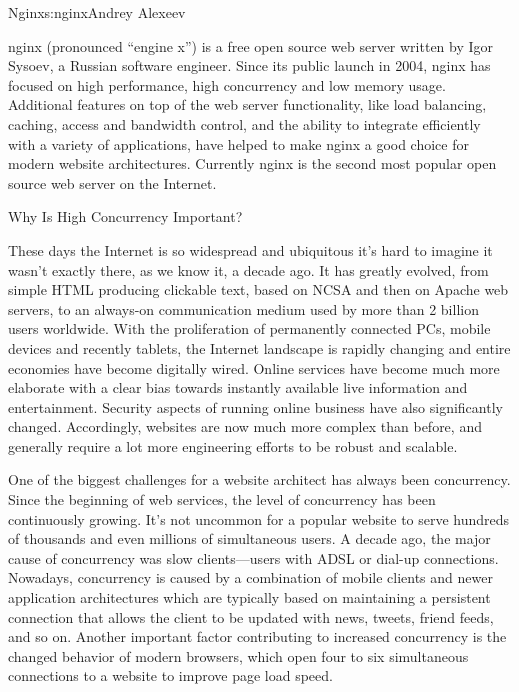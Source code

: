\begin{aosachapter}{Nginx}{s:nginx}{Andrey Alexeev}

nginx (pronounced ``engine x'') is a free open source web server
written by Igor Sysoev, a Russian software engineer. Since its public
launch in 2004, nginx has focused on high performance, high
concurrency and low memory usage. Additional features on top of the
web server functionality, like load balancing, caching, access and
bandwidth control, and the ability to integrate efficiently with a
variety of applications, have helped to make nginx a good choice for
modern website architectures. Currently nginx is the second most
popular open source web server on the Internet.

\begin{aosasect1}{Why Is High Concurrency Important?}


These days the Internet is so widespread and ubiquitous it's hard to
imagine it wasn't exactly there, as we know it, a decade ago. It has greatly evolved,
from simple HTML producing clickable text, based on NCSA and then on
Apache web servers, to an always-on communication medium used by more
than 2 billion users worldwide. With the proliferation of permanently
connected PCs, mobile devices and recently tablets, the Internet
landscape is rapidly changing and entire economies have become
digitally wired. Online services have become much more elaborate with
a clear bias towards instantly available live information and
entertainment. Security aspects of running online business have also
significantly changed. Accordingly, websites are now much more complex
than before, and generally require a lot more engineering efforts to
be robust and scalable.

One of the biggest challenges for a website architect has always been
concurrency. Since the beginning of web services, the level of
concurrency has been continuously growing. It's not uncommon for a
popular website to serve hundreds of thousands and even millions of
simultaneous users. A decade ago, the major cause of concurrency was
slow clients---users with ADSL or dial-up connections. Nowadays,
concurrency is caused by a combination of mobile clients and newer
application architectures which are typically based on maintaining a
persistent connection that allows the client to be updated with news,
tweets, friend feeds, and so on. Another important factor contributing
to increased concurrency is the changed behavior of modern browsers,
which open four to six simultaneous connections to a website to
improve page load speed.


\end{aosasect1}
\end{aosachapter}
